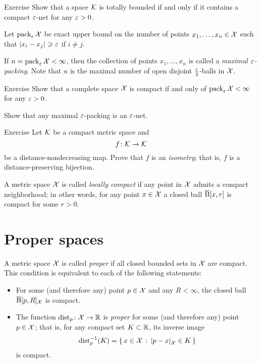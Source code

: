\begin{thm}{Exercise}\label{ex:compact-net}
Show that a space $\mathcal{K}$ is totally bounded if and only if it contains a compact $\varepsilon$-net for any $\varepsilon>0$. 
\end{thm}


Let $\operatorname{\rm pack}\nolimits_\varepsilon\mathcal{X}$ be exact upper bound on the number of points $x_1,\z\dots,x_n\in \spc{X}$ such that $\dist{x_i}{x_j}{}\ge\eps$ if $i\ne j$.

If $n=\operatorname{\rm pack}\nolimits_\varepsilon\mathcal{X}<\infty$, then
the collection of points $x_1,\dots,x_n$ is called a \emph{maximal $\varepsilon$-packing}.
Note that $n$ is the maximal number of open disjoint $\tfrac{\varepsilon}2$-balls in $\mathcal{X}$.

\begin{thm}{Exercise}\label{ex:pack-net}
Show that a complete space $\mathcal{X}$ is compact if and only of $\pack_\eps\spc{X}\z<\infty$ for any $\varepsilon>0$.

Show that any maximal $\varepsilon$-packing is an $\varepsilon$-net.
\end{thm}


\begin{thm}{Exercise}\label{ex:non-contracting-map}
Let $\mathcal{K}$  be a compact metric space and
\[f\:\spc{K}\z\to \spc{K}\] 
be a distance-nondecreasing map.
Prove that $f$ is an \emph{isometry};
that is, $f$ is a distance-preserving bijection.
\end{thm}

A metric space $\mathcal{X}$ is called \emph{locally compact} if any point in $\mathcal{X}$ admits a compact neighborhood;
in other words, for any point $x\in\mathcal{X}$ a closed ball $\overline{\mathrm{B}}{}[x,r]$ is compact for some $r>0$.

\section{Proper spaces}

A metric space $\mathcal{X}$ is called \emph{proper} if all closed bounded sets in $\mathcal{X}$ are compact. 
This condition is equivalent to each of the following statements:
\begin{itemize}
\item For some (and therefore any) point $p\in \mathcal{X}$ and any $R<\infty$, 
the closed ball $\overline{\mathrm{B}}{}[p,R]_{\mathcal{X}}$ is compact. 
\item The function $\mathrm{dist}_p\colon\mathcal{X}\to\mathbb{R}$ is \emph{proper} for some (and therefore any) point $p\in \mathcal{X}$;
that is, for any compact set $K\subset \mathbb{R}$, its inverse image 
\[\distfun_p^{-1}(K)=\set{x\in \spc{X}}{\dist{p}{x}{\spc{X}}\in K}\]
is compact.
\end{itemize}

